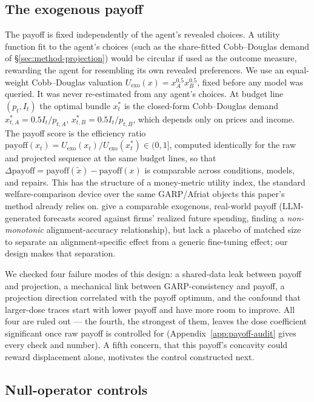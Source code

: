\documentclass{article}
\begin{document}
\subsection{The exogenous payoff}
\label{sec:method-payoff}

The payoff is fixed independently of the agent's revealed choices. A utility function fit
to the agent's choices (such as the share-fitted Cobb--Douglas demand of
\S\ref{sec:method-projection}) would be circular if used as the outcome measure, rewarding the
agent for resembling its own revealed preferences. We use an equal-weight Cobb--Douglas valuation
$U_{\mathrm{exo}}(x) = x_A^{0.5} x_B^{0.5}$, fixed before any model was queried. It was never
re-estimated from any agent's choices. At budget line $(p_t, I_t)$ the optimal bundle
$x^*_t$ is the closed-form Cobb--Douglas demand $x^*_{t,A}=0.5 I_t/p_{t,A}$,
$x^*_{t,B}=0.5 I_t/p_{t,B}$, which depends only on prices and income. The payoff score is the
efficiency ratio
$\mathrm{payoff}(x_t) = U_{\mathrm{exo}}(x_t)/U_{\mathrm{exo}}(x^*_t) \in (0,1]$, computed
identically for the raw and projected sequence at the same budget lines, so that
$\Delta\mathrm{payoff} = \mathrm{payoff}(\tilde{x}) - \mathrm{payoff}(x)$ is comparable across
conditions, models, and repairs. This has the structure of a money-metric utility index, the
standard welfare-comparison device over the same GARP/Afriat objects this paper's method already
relies on. \citet{ouyang2024aidecisionmaker} give a comparable exogenous, real-world payoff
(LLM-generated forecasts scored against firms' realized future spending, finding a
\emph{non-monotonic} alignment-accuracy relationship), but lack a placebo of matched size to
separate an alignment-specific effect from a generic fine-tuning effect; our design makes that
separation.

We checked four failure modes of this design: a shared-data leak between payoff and projection, a
mechanical link between GARP-consistency and payoff, a projection direction correlated with the
payoff optimum, and the confound that larger-dose traces start with lower payoff and have more
room to improve. All four are ruled out --- the fourth, the strongest of them, leaves the dose
coefficient significant once raw payoff is controlled for (Appendix~\ref{app:payoff-audit} gives
every check and number). A fifth concern, that this payoff's concavity could reward displacement
alone, motivates the control constructed next.

\subsection{Null-operator controls}
\label{sec:method-nullop}
\end{document}
